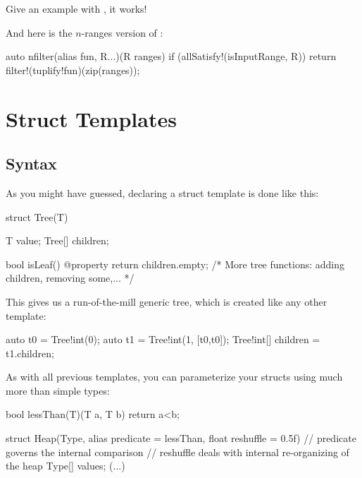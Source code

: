 Give an example with , it works!

And here is the $n$-ranges version of :

\begin{dcode}
auto nfilter(alias fun, R...)(R ranges) if (allSatisfy!(isInputRange, R))
{
    return filter!(tuplify!fun)(zip(ranges));
}
\end{dcode}

\section{Struct Templates}\label{structtemplates}
\subsection{Syntax}\label{structsyntax}

As you might have guessed, declaring a struct template is done like this:

\begin{dcode}
struct Tree(T)
{
    T value;
    Tree[] children;

    bool isLeaf() @property { return children.empty;}
    /* More tree functions: adding children, removing some,... */
}     
\end{dcode}


This gives us a run-of-the-mill generic tree, which is created like any other template:

\begin{dcode}
auto t0 = Tree!int(0);
auto t1 = Tree!int(1, [t0,t0]);
Tree!int[] children = t1.children;
\end{dcode}

As with all previous templates, you can parameterize your structs using much more than simple types:

\begin{dcode}
bool lessThan(T)(T a, T b) { return a<b;}

struct Heap(Type, alias predicate = lessThan, float reshuffle = 0.5f)
{
    // predicate governs the internal comparison
    // reshuffle deals with internal re-organizing of the heap
    Type[] values;
(...)
}
\end{dcode}

